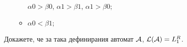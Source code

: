 \begin{hint}
\begin{itemize}
\begin{itemize}
      $\alpha 0 > \beta 0$, $\alpha 1 > \beta 1$, $\alpha 1 > \beta 0$;
    \item
      $\alpha 0 < \beta 1$;
    \end{itemize}
  \end{itemize}
  Докажете, че за така дефинирания автомат $\mathcal{A}$, $\mathcal{L}(\mathcal{A}) = L^R_1$.
\end{hint}

